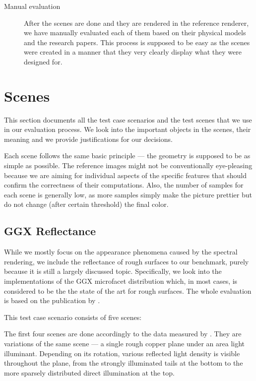 \begin{description}
	\item[Manual evaluation] After the scenes are done and they are rendered in the reference renderer, we have manually evaluated each of them based on their physical models and the research papers. This process is supposed to be easy as the scenes were created in a manner that they very clearly display what they were designed for.
\end{description}

\section{Scenes}
\label{sec:scenes}

This section documents all the test case scenarios and the test scenes that we use in our evaluation process. We look into the important objects in the scenes, their meaning and we provide justifications for our decisions. 

Each scene follows the same basic principle --- the geometry is supposed to be as simple as possible. The reference images might not be conventionally eye-pleasing because we are aiming for individual aspects of the specific features that should confirm the correctness of their computations. Also, the number of samples for each scene is generally low, as more samples simply make the picture prettier but do not change (after certain threshold) the final color.

\subsection{GGX Reflectance}

While we mostly focus on the appearance phenomena caused by the spectral rendering, we include the reflectance of rough surfaces to our benchmark, purely because it is still a largely discussed topic. Specifically, we look into the implementations of the GGX microfacet distribution which, in most cases, is considered to be the the state of the art for rough surfaces. The whole evaluation is based on the publication by \citet{walter2007microfacet}.

This test case scenario consists of five scenes:

The first four scenes are done accordingly to the data measured by \citet{walter2007microfacet}. They are variations of the same scene --- a single rough copper plane under an area light illuminant. Depending on its rotation, various reflected light density is visible throughout the plane, from the strongly illuminated tails at the bottom to the more sparsely distributed direct illumination at the top.

